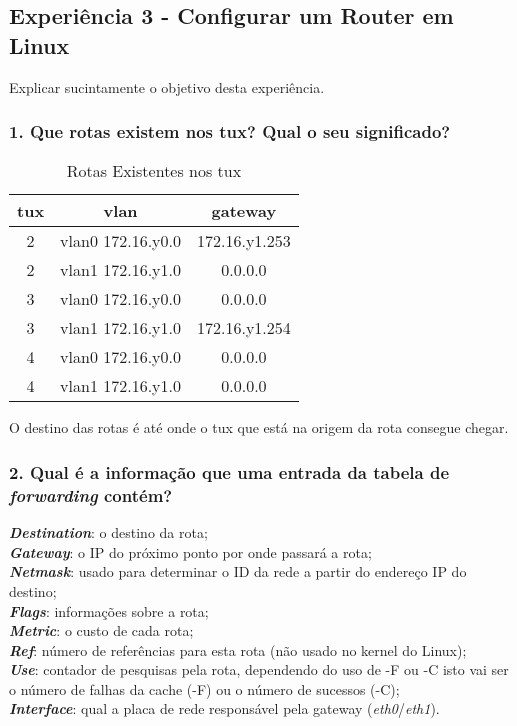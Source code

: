 \subsection*{Experiência 3 - Configurar um Router em Linux}
Explicar sucintamente o objetivo desta experiência.

\subsubsection{1. Que rotas existem nos tux? Qual o seu significado?}
\begin{table}[ht]
\begin{center}
 	\begin{tabular}{|| c c c||} 
 		\hline
 		tux & vlan & gateway \\ [0.5ex] 
 		\hline\hline
 		2 & vlan0 172.16.y0.0 & 172.16.y1.253\\ 
 		\hline
 		2 & vlan1 172.16.y1.0 & 0.0.0.0\\ 
 		\hline\hline
 		3 & vlan0 172.16.y0.0 & 0.0.0.0\\ 
 		\hline
 		3 & vlan1 172.16.y1.0 & 172.16.y1.254\\ 
 		\hline\hline
 		4 & vlan0 172.16.y0.0 & 0.0.0.0\\ 
 		\hline
 		4 & vlan1 172.16.y1.0 & 0.0.0.0\\ [1ex] 
 		\hline
	\end{tabular}
	\caption{Rotas Existentes nos tux}
	\label{tab:table3}
\end{center}
\end{table}

O destino das rotas é até onde o tux que está na origem da rota consegue chegar.

\subsubsection{2. Qual é a informação que uma entrada da tabela de \emph{forwarding} contém?}
\textbf{\emph{Destination}}: o destino da rota;\\
\textbf{\emph{Gateway}}: o IP do próximo ponto por onde passará a rota;\\
\textbf{\emph{Netmask}}: usado para determinar o ID da rede a partir do endereço IP do destino;\\
\textbf{\emph{Flags}}: informações sobre a rota;\\
\textbf{\emph{Metric}}: o custo de cada rota;\\
\textbf{\emph{Ref}}: número de referências para esta rota (não usado no kernel do Linux);\\
\textbf{\emph{Use}}: contador de pesquisas pela rota, dependendo do uso de -F ou -C isto vai ser o número de falhas da cache (-F) ou o número de sucessos (-C);\\
\textbf{\emph{Interface}}: qual a placa de rede responsável pela gateway (\emph{eth0}/\emph{eth1}).

